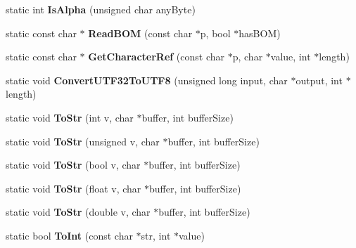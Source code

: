 \begin{DoxyCompactItemize}
static int {\bfseries Is\+Alpha} (unsigned char any\+Byte)
\item 
\mbox{\label{classtinyxml2_1_1XMLUtil_a81aa94479982fe76cfbcfe0dea26ec23}} 
static const char $\ast$ {\bfseries Read\+B\+OM} (const char $\ast$p, bool $\ast$has\+B\+OM)
\item 
\mbox{\label{classtinyxml2_1_1XMLUtil_acddca74146deab644195d600bdd96a9b}} 
static const char $\ast$ {\bfseries Get\+Character\+Ref} (const char $\ast$p, char $\ast$value, int $\ast$length)
\item 
\mbox{\label{classtinyxml2_1_1XMLUtil_aad2d5b0f7e4327bff0bf558148f01a82}} 
static void {\bfseries Convert\+U\+T\+F32\+To\+U\+T\+F8} (unsigned long input, char $\ast$output, int $\ast$length)
\item 
\mbox{\label{classtinyxml2_1_1XMLUtil_a5819187d33b5b4d626399118eb622016}} 
static void {\bfseries To\+Str} (int v, char $\ast$buffer, int buffer\+Size)
\item 
\mbox{\label{classtinyxml2_1_1XMLUtil_a096ca738f14b06866d99489e1c315402}} 
static void {\bfseries To\+Str} (unsigned v, char $\ast$buffer, int buffer\+Size)
\item 
\mbox{\label{classtinyxml2_1_1XMLUtil_ad77298cc6025249b28da58c7289190d1}} 
static void {\bfseries To\+Str} (bool v, char $\ast$buffer, int buffer\+Size)
\item 
\mbox{\label{classtinyxml2_1_1XMLUtil_a6aef5d230e3972fbedda75b0ba5bbcdb}} 
static void {\bfseries To\+Str} (float v, char $\ast$buffer, int buffer\+Size)
\item 
\mbox{\label{classtinyxml2_1_1XMLUtil_a5ddef1a1d33db500b74b45110df48b6c}} 
static void {\bfseries To\+Str} (double v, char $\ast$buffer, int buffer\+Size)
\item 
\mbox{\label{classtinyxml2_1_1XMLUtil_ac7fa220dd1c428ed6a77850d56a6e4bf}} 
static bool {\bfseries To\+Int} (const char $\ast$str, int $\ast$value)
\item 

\end{DoxyCompactItemize}
